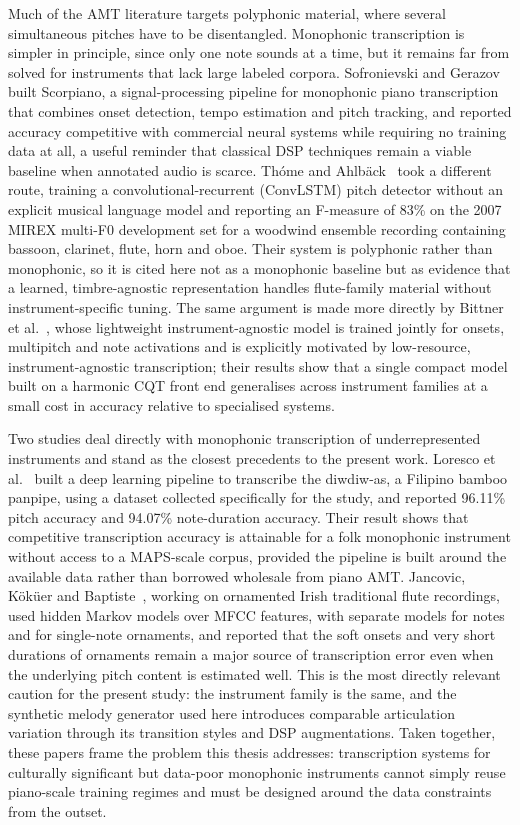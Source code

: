 Much of the AMT literature targets polyphonic material, where several simultaneous pitches have to be disentangled. Monophonic transcription is simpler in principle, since only one note sounds at a time, but it remains far from solved for instruments that lack large labeled corpora. Sofronievski and Gerazov~\cite{ref8} built Scorpiano, a signal-processing pipeline for monophonic piano transcription that combines onset detection, tempo estimation and pitch tracking, and reported accuracy competitive with commercial neural systems while requiring no training data at all, a useful reminder that classical DSP techniques remain a viable baseline when annotated audio is scarce. Th\'{o}me and Ahlb\"{a}ck~\cite{ref9} took a different route, training a convolutional-recurrent (ConvLSTM) pitch detector without an explicit musical language model and reporting an F-measure of 83\% on the 2007 MIREX multi-F0 development set for a woodwind ensemble recording containing bassoon, clarinet, flute, horn and oboe. Their system is polyphonic rather than monophonic, so it is cited here not as a monophonic baseline but as evidence that a learned, timbre-agnostic representation handles flute-family material without instrument-specific tuning. The same argument is made more directly by Bittner et al.~\cite{ref10}, whose lightweight instrument-agnostic model is trained jointly for onsets, multipitch and note activations and is explicitly motivated by low-resource, instrument-agnostic transcription; their results show that a single compact model built on a harmonic CQT front end generalises across instrument families at a small cost in accuracy relative to specialised systems.

Two studies deal directly with monophonic transcription of underrepresented instruments and stand as the closest precedents to the present work. Loresco et al.~\cite{ref11} built a deep learning pipeline to transcribe the diwdiw-as, a Filipino bamboo panpipe, using a dataset collected specifically for the study, and reported 96.11\% pitch accuracy and 94.07\% note-duration accuracy. Their result shows that competitive transcription accuracy is attainable for a folk monophonic instrument without access to a MAPS-scale corpus, provided the pipeline is built around the available data rather than borrowed wholesale from piano AMT. Jancovic, K\"{o}k\"{u}er and Baptiste~\cite{ref12}, working on ornamented Irish traditional flute recordings, used hidden Markov models over MFCC features, with separate models for notes and for single-note ornaments, and reported that the soft onsets and very short durations of ornaments remain a major source of transcription error even when the underlying pitch content is estimated well. This is the most directly relevant caution for the present study: the instrument family is the same, and the synthetic melody generator used here introduces comparable articulation variation through its transition styles and DSP augmentations. Taken together, these papers frame the problem this thesis addresses: transcription systems for culturally significant but data-poor monophonic instruments cannot simply reuse piano-scale training regimes and must be designed around the data constraints from the outset.

